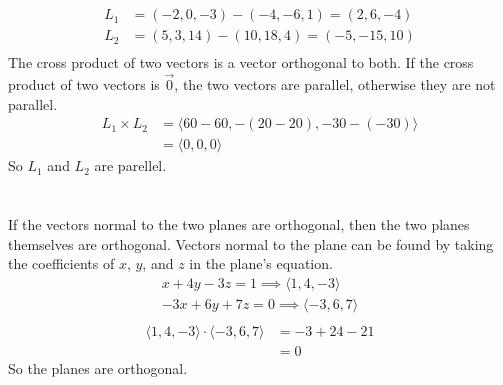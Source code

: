 \documentclass{article}
\begin{document}
\section{}
	\begin{align*}
		L_1&=(-2,0,-3)-(-4,-6,1)=(2,6,-4)\\
		L_2&=(5,3,14)-(10,18,4)=(-5,-15,10)\\
	\end{align*}
	The cross product of two vectors is a vector orthogonal to both. If the cross product of
	two vectors is $\vec{0}$, the two vectors are parallel, otherwise they are not parallel.
	\begin{align*}
		L_1\times{L_2}&=\langle60-60,-{(20-20)},-30-{(-30)}\rangle\\
		&=\langle0,0,0\rangle
	\end{align*}
	So $L_1$ and $L_2$ are parellel.
\section{}
	If the vectors normal to the two planes are orthogonal, then the two planes themselves are orthogonal.
	Vectors normal to the plane can be found by taking the coefficients of $x$, $y$, and $z$ in the plane's equation.
	\begin{align*}
		x+4y-3z=1\implies\langle1,4,-3\rangle\\
		-3x+6y+7z=0\implies\langle-3,6,7\rangle\\
	\end{align*}
	\begin{align*}
		\langle1,4,-3\rangle\cdot\langle-3,6,7\rangle&=-3+24-21\\
		&=0
	\end{align*}
	So the planes are orthogonal.
\end{document}
